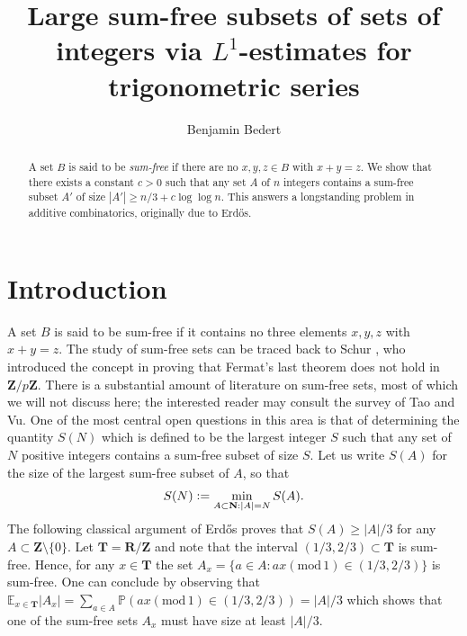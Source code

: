 \documentclass[11pt, reqno]{amsart}
\title{Large sum-free subsets of sets of integers via $L^1$-estimates for trigonometric series}
\author{Benjamin Bedert}
\newcommand{\md}[1]{\ensuremath{(\mbox{mod}\, #1)}}
\begin{document}
\begin{abstract}
A set $B$ is said to be \emph{sum-free} if there are no $x,y,z\in B$ with $x+y=z$. We show that there exists a constant $c>0$ such that any set $A$ of $n$ integers contains a sum-free subset $A'$ of size $|A'|\geqslant n/3+c\log \log n$. This answers a longstanding problem in additive combinatorics, originally due to Erd\H{o}s.

\end{abstract}

\maketitle
\tableofcontents
\section{Introduction}
A set $B$ is said to be sum-free if it contains no three elements $x,y,z$ with $x+y=z$. The study of sum-free sets can be
traced back to Schur \cite{schur}, who introduced the concept in proving that Fermat’s last theorem does not hold in $\mathbf{Z}/p\mathbf{Z}$. There is a substantial amount of literature on sum-free sets, most of which we will not discuss here; the interested reader may consult the survey \cite{taovu} of Tao and Vu. One of the most central open questions in this area is that of determining the quantity $S(N)$ which is defined to be the largest integer $S$ such that any set of $N$ positive integers contains a sum-free subset of size $S$. Let us write $S(A)$ for the size of the largest sum-free subset of $A$, so that
\begin{equation}\label{S(A)defi}
    S(N)\vcentcolon= \min_{A\subset\mathbf{N}:|A|=N}S(A).
\end{equation}
The following classical argument of Erd\H{o}s \cite{erdos} proves that $S(A)\geqslant |A|/3$ for any $A\subset\mathbf{Z}\setminus\{0\}$. Let $\mathbf{T}=\mathbf{R}/\mathbf{Z}$ and note that the interval $(1/3,2/3)\subset\mathbf{T}$ is sum-free. Hence, for any $x\in \mathbf{T}$ the set $A_x=\{a\in A: ax\md 1\in (1/3,2/3)\}$ is sum-free. One can conclude by observing that $\mathbb{E}_{x\in\mathbf{T}}|A_x|=\sum_{a\in A}\mathbb{P}(ax\md1\in (1/3,2/3))=|A|/3$ which shows that one of the sum-free sets $A_x$ must have size at least $|A|/3$. 

\medskip
\end{document}
